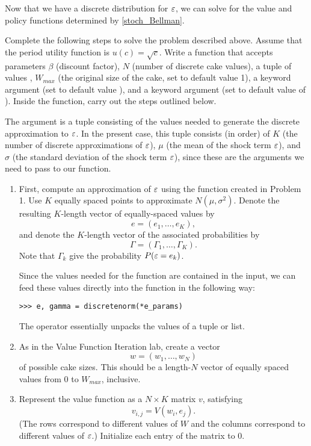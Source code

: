 Now that we have a discrete distribution for $\varepsilon$, we can solve for the value and policy functions
determined by \eqref{stoch_Bellman}.

\begin{problem}
Complete the following steps to solve the problem described above.
Assume that the period utility function is $u(c)=\sqrt{c}$.
Write a function 
that accepts parameters $\beta$ (discount factor), $N$ (number of discrete cake values),
a tuple of values , $W_{max}$ (the original size of the cake, set to default value 1),
a keyword argument  (set to default value ), and
a keyword argument  (set to default value of ). Inside the function, carry out the steps
outlined below.

The argument  is a tuple consisting of the values needed to generate
the discrete approximation to $\varepsilon$. In the present case, this tuple consists (in order) of
$K$ (the number of discrete approximations of $\varepsilon$), $\mu$ (the
mean of the shock term $\varepsilon$), and $\sigma$ (the standard deviation of the shock term $\varepsilon$),
since these are the arguments we need to pass to our  function.

\begin{enumerate}
\item First, compute an approximation of $\varepsilon$ using the  function created in Problem 1.
Use $K$ equally spaced points to approximate $N(\mu,\sigma^2)$. Denote the resulting $K$-length
vector of equally-spaced values by
\[e =(e_1,\ldots,e_K),
\]
and denote the $K$-length vector of the associated probabilities
by
\[\Gamma = (\Gamma_1,\ldots,\Gamma_K).
\]
Note that $\Gamma_k$ give the probability $P(\varepsilon = e_k)$.

Since the values needed for the  function are contained in the  input,
we can feed these values directly into the function in the following way:
\begin{lstlisting}
>>> e, gamma = discretenorm(*e_params)
\end{lstlisting}
The \li{*} operator essentially unpacks the values of a tuple or list.

\item As in the Value Function Iteration lab, create a vector
\[w = (w_1,\ldots,w_N)
\]
of possible cake sizes. This should be
a length-$N$ vector of equally spaced values from 0 to $W_{max}$, inclusive.

\item Represent the value function as a $N \times K$ matrix $v$, satisfying
\[
v_{i,j} = V(w_i, e_j).
\]
(The rows correspond to different values of $W$ and the columns correspond to different values of $\varepsilon$.)
Initialize each entry of the matrix to 0.


\end{enumerate}
\end{problem}
